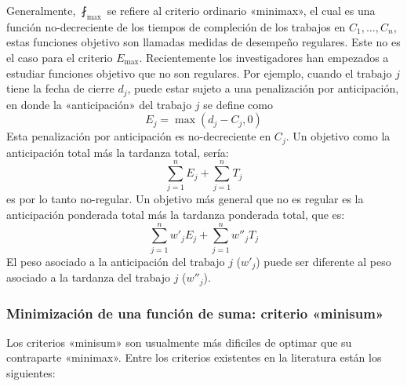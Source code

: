 \documentclass[spanish,draft,12pt,headsepline,footsepline,paper=letter]{scrreprt}
\begin{document}
Generalmente, $\fint_{\max}$ se refiere al criterio ordinario «minimax», el cual es una función no\nobreakdash-decreciente de los tiempos de compleción de los trabajos en $C_1,\dots,C_n$, estas funciones objetivo son llamadas medidas de desempeño regulares. Este no es el caso para el criterio $E_{\max}$. Recientemente los investigadores han empezados a estudiar funciones objetivo que no son regulares. Por ejemplo, cuando el trabajo $j$ tiene la fecha de cierre $d_j$, puede estar sujeto a una penalización por anticipación, en donde la «anticipación» del trabajo $j$ se define como \citep[p.~13]{TKindt2002} 
\[ E_j = \max (d_j - C_j, 0) \]
Esta penalización por anticipación es no\nobreakdash-decreciente en $C_j$. Un objetivo como la anticipación total más la tardanza total, sería:
\[ \sum_{j=1}^{n}E_{j}+\sum_{j=1}^{n}T_{j} \]
es por lo tanto no\nobreakdash-regular. Un objetivo más general que no es regular es la anticipación ponderada total más la tardanza ponderada total, que es:
\[ \sum_{j=1}^{n}w'_jE_{j}+\sum_{j=1}^{n}w''_jT_{j} \]
El peso asociado a la anticipación del trabajo $j$ ($w'_j$) puede ser diferente al peso asociado a la tardanza del trabajo $j$ ($w''_j$).

\subsubsection[Criterio «minisum»]{Minimización de una función de suma: criterio «minisum»}

Los criterios «minisum» son usualmente más dificiles de optimar que su contraparte «minimax». Entre los criterios existentes en la literatura están los siguientes:
\end{document}
